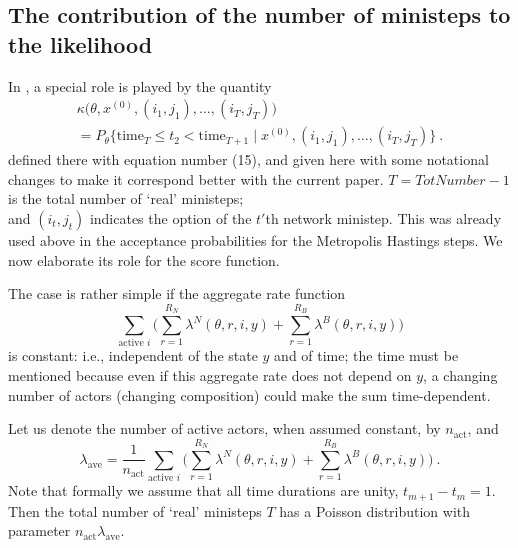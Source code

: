 \documentclass[a4paper,12pt,fleqn]{article}
\begin{document}
\newpage
\begin{appendices}

\section{The contribution of the number of ministeps to the likelihood }
\label{S_A1}

In \citet{SnijdersEA10a},
a special role is played by the quantity
\begin{multline}
   \kappa\big(\theta, x^{(0)}, (i_1, j_1), \ldots, (i_T,j_T) \big)  \\
    = P_{\theta}\{\text{time}_{T} \leq t_2 < \text{time}_{T+1} \mid x^{(0)}, (i_1, j_1), \ldots, (i_T,j_T) \}  \ .
                                                           \label{kappa2}
\end{multline}
defined there with equation number (15),
and given here with some notational changes to make it correspond better
with the current paper.
$T = \textit{TotNumber} - 1$ is the total number of `real' ministeps;\\
and $(i_t, j_t)$ indicates the option of the $t'$th network ministep.
This was already used above in the acceptance probabilities for the Metropolis
Hastings steps. We now elaborate its role for the score function.

The case is rather simple if the aggregate rate function
\begin{equation}
    \sum_{\text{active } i} \bigg( \sum_{r=1}^{R_N} \lambda^N(\theta, r,i, y)
      + \sum_{r=1}^{R_B} \lambda^B(\theta, r,i, y) \bigg)       \label{rate1}
\end{equation}
is constant: i.e., independent of the state $y$ and of time;
the time must be mentioned because even if this aggregate rate
does not depend on $y$, a changing number of actors (changing composition)
could make the sum time-dependent.

Let us denote the number of active actors, when assumed
constant, by $n_{\text{act}}$, and
\begin{equation}
   \lambda_{\text{ave}} = \frac{1}{n_{\text{act}}} \sum_{\text{active } i} \bigg( \sum_{r=1}^{R_N} \lambda^N(\theta, r,i, y)
      + \sum_{r=1}^{R_B} \lambda^B(\theta, r,i, y) \bigg)     \ .  \label{rate2}
\end{equation}
Note that formally we assume that all time durations are unity,
$t_{m+1} - t_m = 1$.
Then the total number of `real' ministeps
$T$ has a Poisson distribution with parameter $n_{\text{act}}\lambda_{\text{ave}}$.


\end{appendices}
\end{document}

